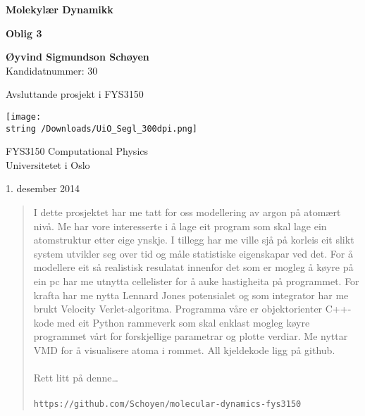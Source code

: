 \documentclass[12pt, a4paper]{article}
\theoremstyle{definition}
\begin{document}
\begin{titlepage}
    \begin{center}
        \vspace*{1cm}
        
        \textbf{\huge Molekylær Dynamikk}

        \vspace{0.5cm}
        \textbf{Oblig 3}

        \vspace{1.5cm}
        \textbf{Øyvind Sigmundson Schøyen} \\
        Kandidatnummer: 30 \\

        \vspace{1.5cm}

        Avsluttande prosjekt i FYS3150 \\

        \vspace{3.0cm}

        \texttt{[image: \\string~/Downloads/UiO\_Segl\_300dpi.png]}

        \vspace{1.0cm}

        FYS3150 Computational Physics\\
        Universitetet i Oslo\\

        \vfill

        1. desember 2014

    \end{center}
\end{titlepage}

\begin{abstract}
    I dette prosjektet har me tatt for oss modellering av argon på atomært nivå. Me har vore interesserte i å lage eit program som skal lage ein atomstruktur etter eige ynskje.
    I tillegg har me ville sjå på korleis eit slikt system utvikler seg over tid og måle statistiske eigenskapar ved det. For å modellere eit så realistisk resulatat innenfor
    det som er mogleg å køyre på ein pc har me utnytta cellelister for å auke hastigheita på programmet. For krafta har me nytta Lennard Jones potensialet og som integrator
    har me brukt Velocity Verlet-algoritma. Programma våre er objektorienter C++-kode med eit Python rammeverk som skal enklast mogleg køyre programmet vårt for forskjellige 
    parametrar og plotte verdiar. Me nyttar VMD for å visualisere atoma i rommet. All kjeldekode ligg på github.\\ \\
    Rett litt på denne\dots \\ \\
    \texttt{https://github.com/Schoyen/molecular-dynamics-fys3150}
\end{abstract}
\end{document}
